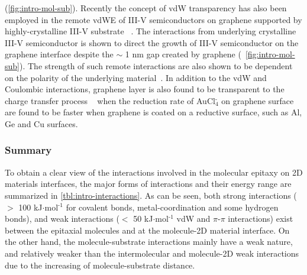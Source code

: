 \autocite{Nguyen_2019_PEN} (\autoref{fig:intro-mol-sub}).
%
Recently the concept of vdW transparency has also been
employed in the remote vdWE of III-V semiconductors on graphene supported by highly-crystalline III-V substrate
~\autocite{Kim_2017_remote_epi_Gr,Kong_2018_vdw_polar}.
%
The interactions from underlying crystalline III-V semiconductor is
shown to direct the growth of III-V semiconductor on the graphene
interface despite the $\sim{}$ 1 nm gap created by graphene (~\autoref{fig:intro-mol-sub}). The
strength of such remote interactions are also shown to be dependent on
the polarity of the underlying material~\autocite{Kong_2018_vdw_polar}.
%
In addition to the vdW and Coulombic interactions,
graphene layer is also found to be transparent to the charge transfer
process ~\autocite{Jeong_2015_DA_transparency_gr} when the reduction rate of
AuCl\(_{\text{4}}^{\text{-}}\) on graphene surface are found to be
faster when graphene is coated on a reductive surface, such as Al, Ge
and Cu surfaces. 


\subsubsection{Summary}
\label{sec:org697d552}

To obtain a clear view of the interactions involved in the molecular
epitaxy on 2D materials interfaces, the major forms
of interactions and their energy range are summarized in
\autoref{tbl:intro-interactions}. As can be seen, both strong interactions ($>$ 100
kJ\(\cdot\)mol\(^{\text{-1}}\) for covalent bonds, metal-coordination and some
hydrogen bonds), and weak interactions ($<$ 50 kJ\(\cdot\)mol\(^{\text{-1}}\) vdW
and \(\pi\)-\(\pi\) interactions) exist between the epitaxial molecules and at
the molecule-2D material interface. On the other hand, the
molecule-substrate interactions mainly have a weak nature, and
relatively weaker than the intermolecular and molecule-2D weak
interactions due to the increasing of molecule-substrate distance.

